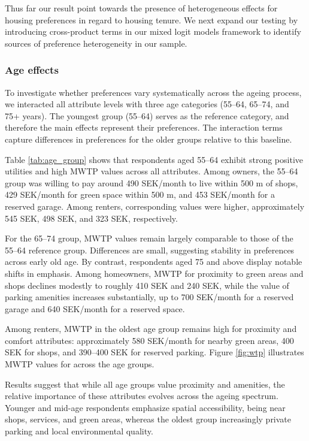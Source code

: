 \documentclass[3p,11pt ]{elsarticle}
\begin{document}
Thus far our result point towards the presence of heterogeneous effects for housing preferences in regard to housing tenure. 
We next expand our testing by introducing cross-product terms in our mixed logit models framework to identify sources of preference heterogeneity in our sample.

\subsubsection{Age effects}

To investigate whether preferences vary systematically across the ageing process, we interacted all attribute levels with three age categories (55–64, 65–74, and 75+ years). The youngest group (55–64) serves as the reference category, and therefore the main effects represent their preferences. The interaction terms capture differences in preferences for the older groups relative to this baseline.

Table \ref{tab:age_group} shows that respondents aged 55–64 exhibit strong positive utilities and high MWTP values across all attributes. Among owners, the 55–64 group was willing to pay around 490 SEK/month to live within 500 m of shops, 429 SEK/month for green space within 500 m, and 453 SEK/month for a reserved garage. Among renters, corresponding values were higher, approximately 545 SEK, 498 SEK, and 323 SEK, respectively.

For the 65–74 group, MWTP values remain largely comparable to those of the 55–64 reference group. Differences are small, suggesting stability in preferences across early old age.
By contrast, respondents aged 75 and above display notable shifts in emphasis.
Among homeowners, MWTP for proximity to green areas and shops declines modestly to roughly 410 SEK and 240 SEK, while the value of parking amenities increases substantially, 
up to 700 SEK/month for a reserved garage and 640 SEK/month for a reserved space.

Among renters, MWTP in the oldest age group remains high for proximity and comfort attributes: approximately 580 SEK/month for nearby green areas, 400 SEK for shops, and 390–400 SEK for reserved parking.
Figure \ref{fig:wtp} illustrates MWTP values for across the age groups.

Results suggest that while all age groups value proximity and amenities, the relative importance of these attributes evolves across the ageing spectrum. Younger and mid-age respondents emphasize spatial accessibility,
being near shops, services, and green areas,
whereas the oldest group increasingly private parking and local environmental quality.
\end{document}
